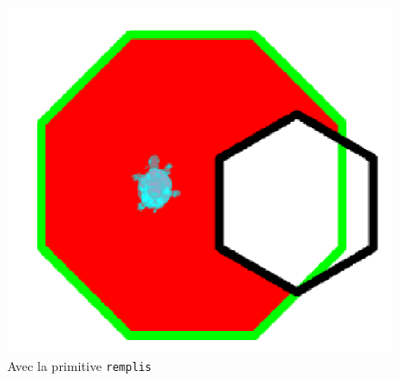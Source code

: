 \begin{figure}[h]
\begin{center}
\includegraphics*[scale=0.2]{images/remplis1.png}
\caption {Avec la primitive \texttt{remplis}}
\end{center}
\end{figure}

